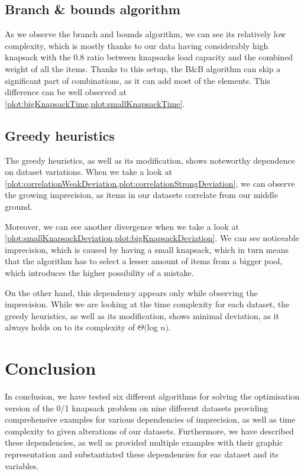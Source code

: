 \subsection{Branch \& bounds algorithm}
As we observe the branch and bounds algorithm, we can see its relatively low complexity,
which is mostly thanks to our data having considerably high knapsack with the 0.8 ratio
between knapsacks load capacity and the combined weight of all the items. Thanks to this
setup, the B\&B algorithm can skip a significant part of combinations, as it can add most
of the elements. This difference can be well observed at
\cref{plot:bigKnapsackTime,plot:smallKnapsackTime}.

\subsection{Greedy heuristics}
The greedy heuristics, as well as its modification, shows noteworthy dependence on dataset
variations. When we take a look at \cref{plot:correlationWeakDeviation,plot:correlationStrongDeviation},
we can observe the growing imprecision, as items in our datasets correlate from our middle ground.

Moreover, we can see another divergence when we take a look at
\cref{plot:smallKnapsackDeviation,plot:bigKnapsackDeviation}. We can see noticeable imprecision,
which is caused by having a small knapsack, which in turn means that the algorithm has to select
a lesser amount of items from a bigger pool, which introduces the higher possibility of a mistake.

On the other hand, this dependency appears only while observing the imprecision. While we are
looking at the time complexity for each dataset, the greedy heuristics, as well as its modification,
shows minimal deviation, as it always holds on to its complexity of  $\Theta($log $n)$.


\section{Conclusion}
In conclusion, we have tested six different algorithms for solving the optimisation version
of the 0/1 knapsack problem on nine different datasets providing comprehensive examples for
various dependencies of imprecision, as well as time complexity to given alterations of our
datasets. Furthermore, we have described these dependencies, as well as provided multiple
examples with their graphic representation and substantiated these dependencies for eac
dataset and its variables.


\newpage

\nocite{*} %


